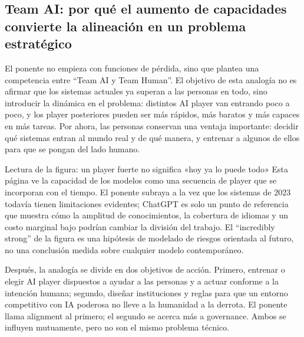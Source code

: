 \subsection{Team AI: por qué el aumento de capacidades convierte la alineación en un problema estratégico}

El ponente no empieza con funciones de pérdida, sino que plantea una competencia entre ``Team AI y Team Human''. El objetivo de esta analogía no es afirmar que los sistemas actuales ya superan a las personas en todo, sino introducir la dinámica en el problema: distintos AI player van entrando poco a poco, y los player posteriores pueden ser más rápidos, más baratos y más capaces en más tareas. Por ahora, las personas conservan una ventaja importante: decidir qué sistemas entran al mundo real y de qué manera, y entrenar a algunos de ellos para que se pongan del lado humano.


\begin{knowledgebox}{Lectura de la figura: un player fuerte no significa «hoy ya lo puede todo»}
Esta página ve la capacidad de los modelos como una secuencia de player que se incorporan con el tiempo. El ponente subraya a la vez que los sistemas de 2023 todavía tienen limitaciones evidentes; ChatGPT es solo un punto de referencia que muestra cómo la amplitud de conocimientos, la cobertura de idiomas y un costo marginal bajo podrían cambiar la división del trabajo. El ``incredibly strong'' de la figura es una hipótesis de modelado de riesgos orientada al futuro, no una conclusión medida sobre cualquier modelo contemporáneo.
\end{knowledgebox}

Después, la analogía se divide en dos objetivos de acción. Primero, entrenar o elegir AI player dispuestos a ayudar a las personas y a actuar conforme a la intención humana; segundo, diseñar instituciones y reglas para que un entorno competitivo con IA poderosa no lleve a la humanidad a la derrota. El ponente llama alignment al primero; el segundo se acerca más a governance. Ambos se influyen mutuamente, pero no son el mismo problema técnico.


